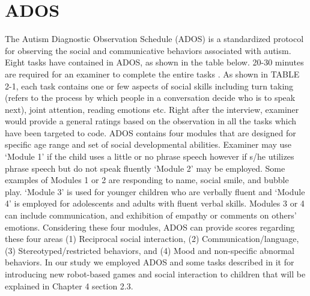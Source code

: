 \section{ADOS}
The Autism Diagnostic Observation Schedule (ADOS) is a standardized protocol
for observing the social and communicative behaviors associated with autism. Eight tasks
have contained in ADOS, as shown in the table below. 20-30 minutes are required for an
examiner to complete the entire tasks \cite{AutismDiagno1989}.
As shown in TABLE 2-1, each task contains one or few aspects of social skills
including turn taking (refers to the process by which people in a conversation decide who
is to speak next), joint attention, reading emotions etc. Right after the interview, examiner
would provide a general ratings based on the observation in all the tasks which have been
targeted to code.
ADOS contains four modules that are designed for specific age range and set of social
developmental abilities. Examiner may use ‘Module 1’ if the child uses a little or no phrase
speech however if s/he utilizes phrase speech but do not speak fluently ‘Module 2’ may be
employed. Some examples of Modules 1 or 2 are responding to name, social smile, and
bubble play. ‘Module 3’ is used for younger children who are verbally fluent and ‘Module
4’ is employed for adolescents and adults with fluent verbal skills. Modules 3 or 4 can
include communication, and exhibition of empathy or comments on others' emotions.
Considering these four modules, ADOS can provide scores regarding these four areas (1)
Reciprocal social interaction, (2) Communication/language, (3) Stereotyped/restricted
behaviors, and (4) Mood and non-specific abnormal behaviors. In our study we employed
ADOS and some tasks described in it for introducing new robot-based games and social
interaction to children that will be explained in Chapter 4 section 2.3.



